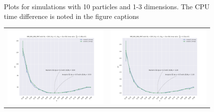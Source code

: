 \begin{figure}
\begin{tabular}{cc}
\end{tabular}
\caption{Plots for simulations with 10 particles and 1-3 dimensions. The CPU time difference is noted in the figure captions}
\label{fig:1b_10}
\end{figure}

\begin{figure}
\hspace{-2.8cm}
\begin{tabular}{cc}
\includegraphics[width = 0.5\paperwidth]{figures/NM_NIA_NIN_np_100_nd_1.pdf} & \includegraphics[width = 0.5\paperwidth]{figures/NM_NIA_NIN_np_100_nd_2.pdf} \\

\end{tabular}
\end{figure}
